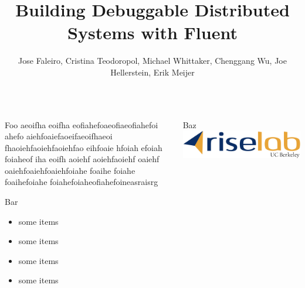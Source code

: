 \documentclass[final]{beamer}
\title{Building Debuggable Distributed Systems with Fluent}
\author{
  Jose Faleiro,%
  Cristina Teodoropol,%
  Michael Whittaker,%
  Chenggang Wu,%
  Joe Hellerstein,%
  Erik Meijer%
}
\begin{document}
\begin{frame}{}
  \begin{columns}[t]
    \begin{column}{0.48\textwidth}
      \begin{block}{Foo}
        aeoifha eoifha eofiahefoaeofiaeofiahefoi ahefo
        aiehfoaiefaoeifaeoifhaeoi fhaoiehfaoiehfaoiehfao eihfoaie hfoiah efoiah
        foiaheof iha eoifh aoiehf aoiehfaoiehf oaiehf oaiehfoaiehfoaiehfoiahe
        foaihe foiahe foaihefoiahe foiahefoiaheofiahefoineasraisrg
      \end{block}

      \begin{block}{Bar}
        \begin{itemize}
          \item some items
          \item some items
          \item some items
          \item some items
        \end{itemize}
      \end{block}
    \end{column}

    \begin{column}{0.48\textwidth}
      \begin{block}{Baz}
        \includegraphics[width=\textwidth]{rise_logo.jpg}
      \end{block}
    \end{column}
  \end{columns}
\end{frame}
\end{document}
